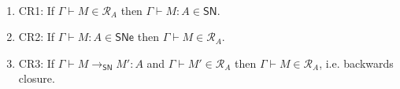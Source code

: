 \documentclass{article}
\newcommand{\SN}{\mathsf{SN}}
\newcommand{\SNe}{\mathsf{SNe}}
\newcommand{\CR}{\textsf{CR}}
\newcommand{\denot}[1]{\mathcal{R}_{#1}}
\newcommand{\inden}[3]{#1 \vdash #2 \in \denot{#3}}
\newcommand{\redSN}{\longrightarrow_\SN}
\def\lv{\mathopen{{[\kern-0.14em[}}}    %
\def\rv{\mathclose{{]\kern-0.14em]}}}   %
\newcommand{\den}[1]{\lv #1 \rv}
\begin{document}
\begin{theorem}\label{thm:redcand}~
  \begin{enumerate}
  \item\label{cr1} \CR 1: If $\inden{\Gamma}{M}{A}$ then $\Gamma \vdash M : A \in \SN$. %
  \item\label{cr2} \CR 2: If $\Gamma \vdash M : A \in \SNe$ then $\inden{\Gamma}{M}{A}$. %
  \item\label{cr3} \CR 3: If $\Gamma \vdash M \redSN M' : A$ and $\inden{\Gamma}{M'}{A}$ then $\inden{\Gamma}{M}{A}$, i.e. backwards closure.
  \end{enumerate}
\end{theorem}
\end{document}
